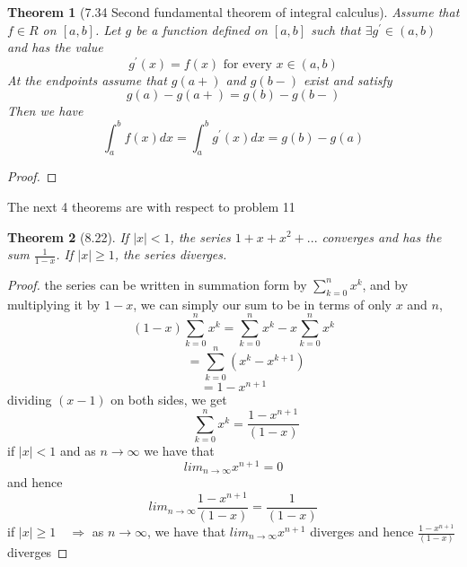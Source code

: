 \documentclass[aps,pra,notitlepage,amsmath,amssymb,letterpaper,12pt]{revtex4-1}
\newtheorem{theorem}{Theorem}
\begin{document}
\begin{theorem}[7.34 Second fundamental theorem of integral calculus]
Assume that $f \in R$ on $[a,b]$. Let $g$ be a function defined on $[a,b]$ such that $\exists g^\prime \in (a,b)$ and has the value
\[g^\prime(x) = f(x) \textrm{ for every } x \in (a,b)\]
At the endpoints assume that $g(a+)$ and $g(b-)$ exist and satisfy
\[g(a) - g(a+) = g(b) - g(b-)\]
Then we have
\[\int_{a}^{b} f(x)dx = \int_{a}^{b} g^\prime(x)dx = g(b) - g(a)\]
\end{theorem}
\begin{proof}
\end{proof}

The next 4 theorems are with respect to problem 11
\begin{theorem}[8.22]
If $|x| < 1$, the series $1 + x + x^2 + ... $  converges and has the sum $\frac{1}{1-x}$. If $|x| \geq 1$, the series diverges.
\end{theorem}
\begin{proof}
the series can be written in summation form by $\sum_{k=0}^{n}x^k$, and by multiplying it by $1-x$, we can simply our sum to be in terms of only $x$ and $n$,
    $$(1-x)\sum_{k=0}^{n}x^k = \sum_{k=0}^{n}x^k - x\sum_{k=0}^{n}x^k$$
    $$\qquad = \sum_{k=0}^{n}(x^k - x^{k+1})$$
    $$ = 1-x^{n+1}$$
    dividing $(x-1)$ on both sides, we get
    $$\qquad \sum_{k=0}^{n}x^k = \frac{1-x^{n+1}}{(1-x)}$$
if $ \left| x \right| < 1$ and as $n \rightarrow \infty$ we have that
$$lim_{n \rightarrow \infty}x^{n+1} = 0$$
and hence
$$lim_{n \rightarrow \infty}\frac{1-x^{n+1}}{(1-x)}=\frac{1}{(1-x)}$$
if $ \left| x \right| \geq 1 \quad \Rightarrow$ as $n \rightarrow \infty$, we have that
$lim_{n \rightarrow \infty}x^{n+1}$ diverges and hence $\frac{1-x^{n+1}}{(1-x)}$ diverges
\end{proof}
\end{document}
